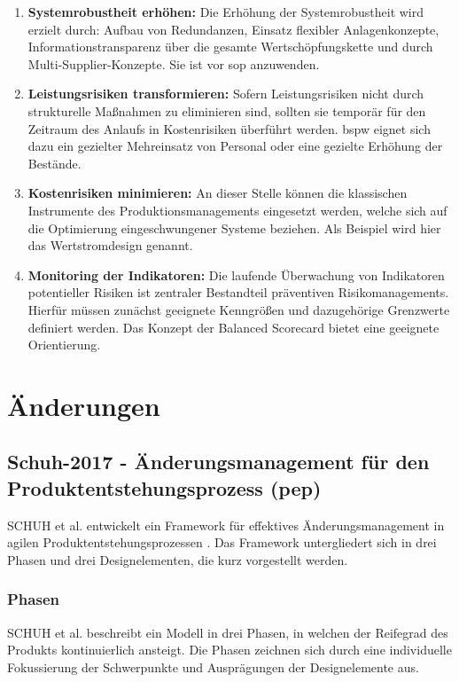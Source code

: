 \begin{enumerate}
 \item \textbf{Systemrobustheit erhöhen: }
 Die Erhöhung der Systemrobustheit wird erzielt durch: Aufbau von Redundanzen, Einsatz flexibler Anlagenkonzepte, Informationstransparenz über die gesamte Wertschöpfungskette und durch Multi-Supplier-Konzepte. Sie ist vor \gls{sop} anzuwenden. 
 \item \textbf{Leistungsrisiken transformieren: }
 Sofern Leistungsrisiken nicht durch strukturelle Maßnahmen zu eliminieren sind, sollten sie temporär für den Zeitraum des Anlaufs in Kostenrisiken überführt werden. \Gls{bspw} eignet sich dazu ein gezielter Mehreinsatz von Personal oder eine gezielte Erhöhung der Bestände. 
 \item \textbf{Kostenrisiken minimieren: }
 An dieser Stelle können die klassischen Instrumente des Produktionsmanagements eingesetzt werden, welche sich auf die Optimierung eingeschwungener Systeme beziehen. Als Beispiel wird hier das Wertstromdesign genannt. 
 \item \textbf{Monitoring der Indikatoren: }
 Die laufende Überwachung von Indikatoren potentieller Risiken ist zentraler Bestandteil präventiven Risikomanagements. 
 Hierfür müssen zunächst geeignete Kenngrößen und dazugehörige Grenzwerte definiert werden. Das Konzept der Balanced Scorecard bietet eine geeignete Orientierung. 
\end{enumerate}

\section{Änderungen}

\subsection*{Schuh-2017 - Änderungsmanagement für den Produktentstehungsprozess (\gls{pep})}\label{sec:schuh2017}
SCHUH et al. entwickelt ein Framework für effektives Änderungsmanagement in agilen Produktentstehungsprozessen \autocite{Schuh2017}. Das Framework untergliedert sich in drei Phasen und drei Designelementen, die kurz vorgestellt werden. 

\subsubsection*{Phasen}
SCHUH et al. beschreibt ein Modell in drei Phasen, in welchen der Reifegrad des Produkts kontinuierlich ansteigt. %
Die Phasen zeichnen sich durch eine individuelle Fokussierung der Schwerpunkte und Ausprägungen der Designelemente aus. 

